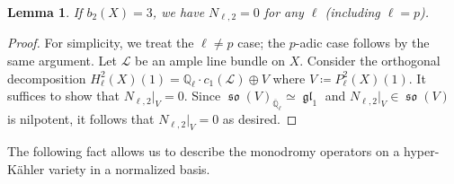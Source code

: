 \documentclass[12pt,reqno]{amsart}
\newtheorem{lem}[thm]{Lemma}
\theoremstyle{definition}
\newcommand{\Q}{{\mathds Q}}
\newcommand\gl{\mathop{\mathfrak{gl}}\nolimits}
\newcommand\so{\mathop{\mathfrak{so}}\nolimits}
\newcommand{\scrL}{\mathscr{L}}
\numberwithin{equation}{section}
\begin{document}
\begin{lem}\label{lem:nilpotencyH2 of b2=3}
 If $b_2(X) = 3$, we have $N_{\ell,2}=0$ for any $\ell$ (including $\ell =p$).
 \end{lem}
 \begin{proof}
For simplicity, we treat the $\ell \neq p$ case; the $p$-adic case follows by the same argument.
Let $\mathscr{L}$ be an ample line bundle on $X$.
Consider the orthogonal decomposition
$H^2_{\ell}(X)(1) = \Q_\ell \cdot c_1(\scrL) \oplus V$
where $V\coloneqq P^2_{\ell}(X)(1)$.
It suffices to show that $N_{\ell, 2} \vert_V =0$.
Since $\so(V)_{\overline{\Q}_\ell} \simeq \gl_1$ and $N_{\ell, 2} \vert_V \in \so(V)$ is nilpotent, it follows that $N_{\ell, 2} \vert_V=0$ as desired.
\end{proof}





The following fact allows us to describe the monodromy operators on a hyper-Kähler variety in a normalized basis.
\end{document}
